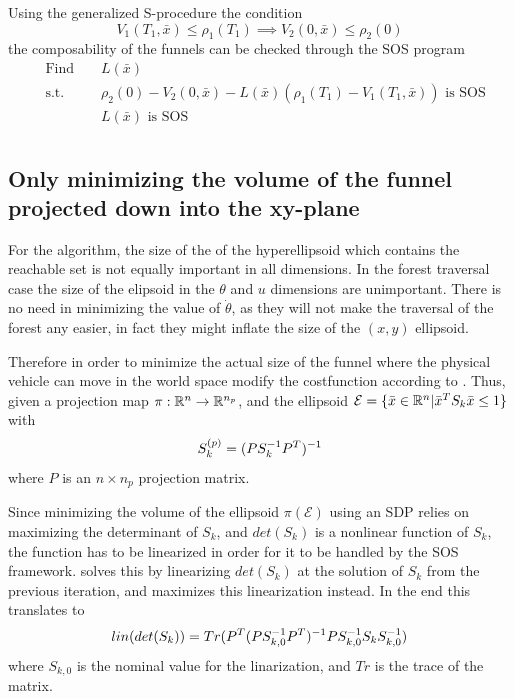 Using the generalized S-procedure the condition
\begin{equation}
  V_1(T_1,\bar{x}) \leq \rho_1(T_1) \implies V_2(0, \bar{x}) \leq \rho_2(0)
\end{equation}
the composability of the funnels can be checked through the \ac{SOS} program
\begin{align*}
    & \text{Find } && L(\bar{x}) \\
    & \text{s.t. } && \rho_2(0) - V_2(0,\bar{x}) - L(\bar{x})\left( \rho_1(T_1) - V_1(T_1,\bar{x}) \right) \text{ is SOS} \\
    &&& L(\bar{x}) \text{ is SOS} \\
\end{align*}

\subsection{Only minimizing the volume of the funnel projected down into the
  xy-plane}

For the \rrtfunnel{} algorithm, the size of the of the hyperellipsoid which
contains the reachable set is not equally important in all dimensions. In the
forest traversal case the size of the elipsoid in the \(\theta\) and \(u\)
dimensions are unimportant. There is no need in minimizing the value of
\(\dot{\theta}\), as they will not make the traversal of the forest any easier,
in fact they might inflate the size of the \((x,y)\) ellipsoid.

Therefore in order to minimize the actual size of the funnel where the physical
vehicle can move in the world space modify the costfunction according to
\cite{majumdarFunnelLibrariesRealtime2017}. Thus, given a projection map \(\pi :
\mathbb{R}^n \rightarrow \mathbb{R}^{n_p}\), and the ellipsoid \(\mathcal{E} = \lbrace\bar{x} \in
  \mathbb{R}^n | \bar{x}^TS_{k}\bar{x} \leq 1\rbrace\) with
\[
  S_k^{(p)} = \lparen PS_k^{-1}P^T\rparen^{-1}
\]
where \(P\) is an \(n\times n_p\) projection matrix.

Since minimizing the volume of the ellipsoid \(\pi(\mathcal{E})\) using an \ac{SDP}
relies on maximizing the determinant of \(S_k\), and \(det(S_k)\) is a nonlinear
function of \(S_k\), the function has to be linearized in order for it to be
handled by the \ac{SOS}
framework. \cite[Majumdar]{majumdarFunnelLibrariesRealtime2017} solves this by
linearizing \(det(S_k)\) at the solution of \(S_k\) from the previous iteration,
and maximizes this linearization instead. In the end this translates to
\[
  \mathnormal{lin}\lparen det\lparen S_k\rparen\rparen =
  Tr\lparen P^T\lparen PS_{k,0}^{-1}P^T\rparen^{-1}PS_{k,0}^{-1}S_kS_{k,0}^{-1}\rparen
\]
where \(S_{k,0}\) is the nominal value for the linarization, and \(Tr\) is the
trace of the matrix.

